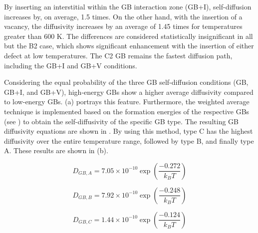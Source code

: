 \documentclass[review]{elsarticle}
\begin{document}
By inserting an interstitial within the GB interaction zone (GB+I), self-diffusion increases by, on average, 1.5 times. On the other hand, with the insertion of a vacancy, the diffusivity increases by an average of 1.45 times for temperatures greater than 600 K. The differences are considered statistically insignificant in all but the B2 case, which shows significant enhancement with the insertion of either defect at low temperatures. The C2 GB remains the fastest diffusion path, including the GB+I and GB+V conditions. 

Considering the equal probability of the three GB self-diffusion conditions (GB, GB+I, and GB+V), high-energy GBs show a higher average diffusivity compared to low-energy GBs.  (a) portrays this feature. Furthermore, the weighted average technique is implemented based on the formation energies of the respective GBs (see ) to obtain the self-diffusivity of the specific GB type. The resulting GB diffusivity equations are shown in . By using this method, type C has the highest diffusivity over the entire temperature range, followed by type B, and finally type A. These results are shown in  (b). %

\begin{equation}
\label{eq:type}
D_{GB,A} = 7.05 \times 10^{-10} \exp\left(\frac{-0.272}{k_{B} T}\right)
\end{equation}

\begin{equation}
\label{eq:type1}
D_{GB,B} = 7.92 \times 10^{-10} \exp\left(\frac{-0.248}{k_{B} T}\right)
\end{equation}

\begin{equation}
\label{eq:type2}
D_{GB,C} = 1.44 \times 10^{-10} \exp\left(\frac{-0.124}{k_{B} T}\right)
\end{equation}
\end{document}
